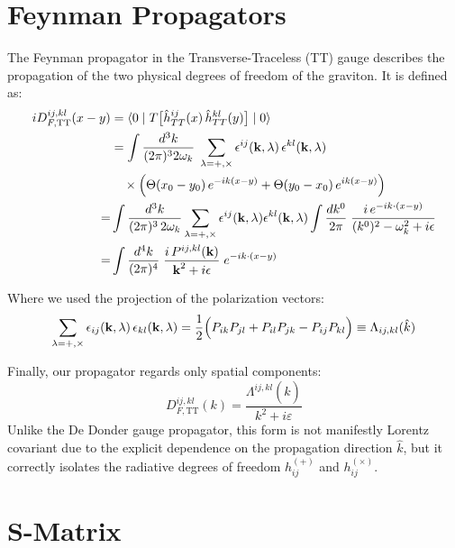 \documentclass[12pt,a4paper]{article}
\begin{document}
\section{Feynman Propagators}
The Feynman propagator in the Transverse-Traceless (TT) gauge describes the propagation of the two physical degrees of freedom of the graviton. It is defined as:
\begin{align}
    i D_{F, \text{TT}}^{ij,kl}(x-y) &= \langle 0 \mid T\bigl[\hat{h}_{TT}^{ij}(x)\,\hat{h}_{TT}^{kl}(y)\bigr] \mid 0\rangle \notag\\
    &= \int \frac{d^3k}{(2\pi)^3 2\omega_k} \;\sum_{\lambda=+, \times} \epsilon^{ij}(\mathbf{k},\lambda)\,\epsilon^{kl}(\mathbf{k},\lambda) \notag\\
    &\quad \times \Bigl( \Theta(x_0 - y_0)\,e^{-ik(x-y)} + \Theta(y_0 - x_0)\,e^{ik(x-y)} \Bigr)
    \\=&
\int \frac{d^3k}{(2\pi)^3\,2\omega_k}
\sum_{\lambda=+,\times}
\epsilon^{ij}(\mathbf{k},\lambda)\epsilon^{kl}(\mathbf{k},\lambda) \notag 
\int \frac{dk^0}{2\pi}\;
\frac{i\,e^{-ik\cdot(x-y)}}{(k^0)^2-\omega_k^2+i\epsilon} \\=&\int \frac{d^4k}{(2\pi)^4}\;
\frac{i\,P^{ij,kl}(\mathbf{k})}{\textbf{k}^2+i\epsilon}\;
e^{-ik\cdot(x-y)}
\end{align}

Where we used the projection of the polarization vectors:
\begin{equation}
    \sum_{\lambda=+, \times} \epsilon_{ij}(\mathbf{k},\lambda)\,\epsilon_{kl}(\mathbf{k},\lambda) = \frac{1}{2}\Bigl(P_{ik}P_{jl} + P_{il}P_{jk} - P_{ij}P_{kl}\Bigr) \equiv \Lambda_{ij,kl}(\hat{k})
\end{equation}

Finally, our propagator regards only spatial components:
\begin{equation}
    \boxed{ D_{F, \text{TT}}^{ij,kl}(k) = \frac{\Lambda^{ij,kl}(\hat{k})}{k^2  + i\varepsilon} }
\end{equation}
Unlike the De Donder gauge propagator, this form is not manifestly Lorentz covariant due to the explicit dependence on the propagation direction $\hat{k}$, but it correctly isolates the radiative degrees of freedom $h_{ij}^{(+)}$ and $h_{ij}^{(\times)}$.



\section{S-Matrix}
\end{document}

